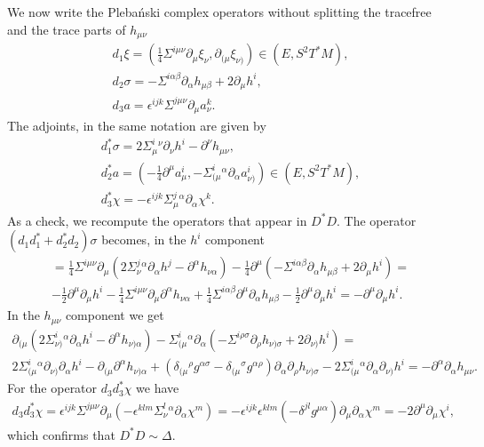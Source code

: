 \documentclass[10pt]{report}
\newcommand{\pleb}[0]{Pleba\'nski}
\theoremstyle{definition}
\begin{document}
We now write the \pleb{} complex operators without splitting the tracefree and the trace parts of $h_{\mu\nu}$
\begin{align}
d_1 \xi = ( \frac{1}{4} \Sigma^{i\mu\nu} \partial_\mu \xi_\nu, \partial_{(\mu} \xi_{\nu)}) \in (E,S^2 T^*M) , \\ \nonumber
d_2 \sigma = -  \Sigma^{i\alpha\beta} \partial_\alpha h_{\mu\beta} +2 \partial_\mu h^i, \\ \nonumber
d_3 a = \epsilon^{ijk} \Sigma^{j\mu\nu} \partial_\mu a_\nu^k.
\end{align}
The adjoints, in the same notation are given by 
\begin{align}
d_1^* \sigma = 2 \Sigma^i_\mu{}^\nu \partial_\nu h^i - \partial^\nu h_{\mu\nu}, \\ \nonumber
d_2^* a =( -\frac{1}{4} \partial^\mu a_\mu^i , - \Sigma^i_{(\mu}{}^\alpha \partial_\alpha a_{\nu)}^i) \in (E,S^2 T^*M), \\ \nonumber
d_3^* \chi =  - \epsilon^{ijk} \Sigma^j_\mu{}^\alpha \partial_\alpha \chi^k.
\end{align}
As a check, we recompute the operators that appear in $D^* D$. The operator $(d_1 d_1^* +d_2^* d_2 ) \sigma$ becomes, in the $h^i$ component
\begin{align}
 =  \frac{1}{4} \Sigma^{i\mu\nu} \partial_\mu (2 \Sigma^j_\nu{}^\alpha \partial_\alpha h^j - \partial^\alpha h_{\nu\alpha})
 -\frac{1}{4} \partial^\mu (-  \Sigma^{i\alpha\beta} \partial_\alpha h_{\mu\beta} +2 \partial_\mu h^i) = \\ \nonumber
 -\frac{1}{2}   \partial^\mu \partial_\mu h^i -  \frac{1}{4} \Sigma^{i\mu\nu} \partial_\mu\partial^\alpha h_{\nu\alpha}
 + \frac{1}{4}   \Sigma^{i\alpha\beta} \partial^\mu \partial_\alpha h_{\mu\beta} - \frac{1}{2} \partial^\mu\partial_\mu h^i = -  \partial^\mu\partial_\mu h^i .
 \end{align}
 In the $h_{\mu\nu}$ component we get
 \begin{align}
 \partial_{(\mu} (2 \Sigma^i_{\nu)}{}^\alpha \partial_\alpha h^i - \partial^\alpha h_{\nu)\alpha})- \Sigma^i_{(\mu}{}^\alpha \partial_\alpha  (-  \Sigma^{i\rho\sigma} \partial_\rho h_{\nu)\sigma} +2 \partial_{\nu)} h^i)= \\ \nonumber
 2 \Sigma^i_{(\mu}{}^\alpha \partial_{\nu)} \partial_\alpha h^i -  \partial_{(\mu} \partial^\alpha h_{\nu)\alpha} + ( \delta_{(\mu}{}^\rho g^{\alpha\sigma} - \delta_{(\mu}{}^\sigma g^{\alpha\rho}) \partial_\alpha \partial_\rho h_{\nu)\sigma} - 2\Sigma^i_{(\mu}{}^\alpha \partial_\alpha \partial_{\nu)} h^i = - \partial^\alpha \partial_\alpha h_{\mu\nu}.
 \end{align}
 For the operator $d_3 d_3^* \chi$ we have
 \begin{align}
 d_3 d_3^* \chi= \epsilon^{ijk} \Sigma^{j\mu\nu} \partial_\mu (- \epsilon^{klm} \Sigma^l_\nu{}^\alpha \partial_\alpha \chi^m)=
 - \epsilon^{ijk}\epsilon^{klm} (- \delta^{jl} g^{\mu\alpha}) \partial_\mu\partial_\alpha \chi^m = - 2 \partial^\mu \partial_\mu \chi^i,
 \end{align}
 which confirms that $D^* D\sim \Delta$.  
 
\end{document}
